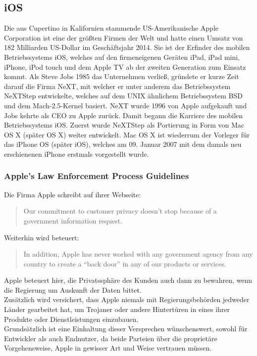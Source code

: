 \subsection{iOS}
	Die aus Cupertino in Kalifornien stammende US-Amerikanische Apple Corporation
	ist eine der größten Firmen der Welt und hatte einen Umsatz von 182 Milliarden
	US-Dollar im Geschäftsjahr 2014. Sie ist der Erfinder des mobilen
	Betriebssystems iOS, welches auf den firmeneigenen Geräten iPad, iPad mini,
	iPhone, iPod touch und dem Apple TV ab der zweiten Generation zum Einsatz
	kommt. Als Steve Jobs 1985 das Unternehmen verließ, gründete er
	kurze Zeit darauf die Firma NeXT, mit welcher er unter anderem das
	Betriebssystem NeXTStep entwickelte, welches auf dem UNIX ähnlichem
	Betriebssystem BSD\cite[S.12]{Tanenbaum2009} und dem
	Mach-2.5-Kernel\cite{MachProject2015} basiert. NeXT wurde 1996 von Apple
	aufgekauft und Jobs kehrte als CEO zu Apple zurück. Damit begann die Karriere
	des mobilen Betriebssystems iOS. Zuerst wurde NeXTStep als Portierung in Form
	von Mac OS X (später OS X) weiter entwickelt. Mac OS X ist wiederrum der
	Vorleger für das iPhone OS (später iOS), welches am 09. Januar 2007 mit dem
	damals neu erschienenen iPhone erstmals vorgestellt wurde.
	
	\subsubsection{Apple's Law Enforcement Process Guidelines}
		Die Firma Apple schreibt auf ihrer Webseite:
		\begin{quote}
			Our commitment to customer privacy doesn't stop because of a government
			information request.\cite{AppleGovInfo2015}
		\end{quote}
		Weiterhin wird beteuert:
		\begin{quote}
			In addition, Apple has never worked with any government agency from any
			country to create a "`back door"' in any of our products or
			services.\cite{AppleGovInfo2015}
		\end{quote}
		Apple beteuert hier, die Privatssphäre des Kunden auch dann zu bewahren,
		wenn die Regierung um Auskunft der Daten bittet.\\
		Zusätzlich wird versichert, dass Apple niemals mit Regierungsbehörden
		jedweder Länder gearbeitet hat, um Trojaner oder andere Hintertüren in eines
		ihrer Produkte oder Dienstleistungen einzubauen.\\
		Grundsätzlich ist eine Einhaltung dieser Versprechen wünschenswert, sowohl für
		Entwickler als auch Endnutzer, da beide Parteien über die proprietäre
		Vorgehensweise, Apple in gewisser Art und Weise vertrauen müssen.
